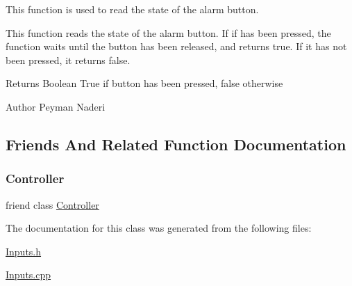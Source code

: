 This function is used to read the state of the alarm button. 

This function reads the state of the alarm button. If if has been pressed, the function waits until the button has been released, and returns true. If it has not been pressed, it returns false.

\begin{DoxyReturn}{Returns}
Boolean True if button has been pressed, false otherwise 
\end{DoxyReturn}
\begin{DoxyAuthor}{Author}
Peyman Naderi 
\end{DoxyAuthor}


\subsection{Friends And Related Function Documentation}
\mbox{\label{classInputs_ac3456fd331a58b288082abca310c7a99}} 
\subsubsection{\texorpdfstring{Controller}{Controller}}
{\footnotesize\ttfamily friend class \hyperlink{classController}{Controller}\hspace{0.3cm}{\ttfamily [friend]}}



The documentation for this class was generated from the following files\+:\begin{DoxyCompactItemize}
\item 
\hyperlink{Inputs_8h}{Inputs.\+h}\item 
\hyperlink{Inputs_8cpp}{Inputs.\+cpp}\end{DoxyCompactItemize}
